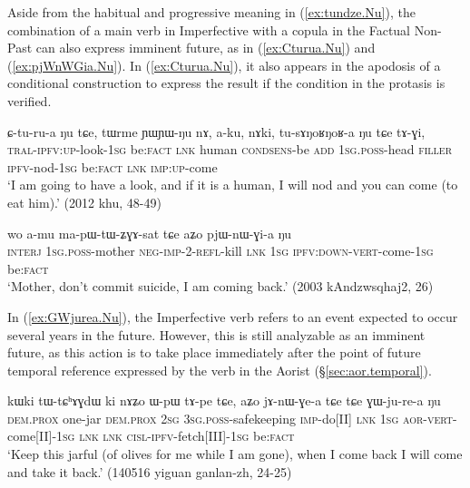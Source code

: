 Aside from the habitual and progressive meaning in (\ref{ex:tundze.Nu}), the  combination of a main verb in Imperfective with a copula in the Factual Non-Past can also express imminent future, as in (\ref{ex:Cturua.Nu}) and (\ref{ex:pjWnWGia.Nu}). In (\ref{ex:Cturua.Nu}), it also appears in the apodosis of a conditional construction to express the result if the condition in the protasis is verified.

\begin{exe}
\ex \label{ex:Cturua.Nu}
\gll  ɕ-tu-ru-a ŋu tɕe, tɯrme ɲɯ\redp{}ɲɯ-ŋu nɤ, a-ku, nɤki, tu-sɤŋoʁŋoʁ-a ŋu tɕe tɤ-ɣi, \\
\textsc{tral}-\textsc{ipfv}:\textsc{up}-look-\textsc{1sg} be:\textsc{fact} \textsc{lnk} human \textsc{cond}\redp{}\textsc{sens}-be \textsc{add} \textsc{1sg}.\textsc{poss}-head \textsc{filler} \textsc{ipfv}-nod-\textsc{1sg} be:\textsc{fact} \textsc{lnk} \textsc{imp}:\textsc{up}-come \\
\glt `I am going to have a look, and if it is a human, I will nod and you can come (to eat him).' (2012 khu, 48-49)
\end{exe}

\begin{exe}
\ex \label{ex:pjWnWGia.Nu}
\gll wo a-mu ma-pɯ-tɯ-ʑɣɤ-sat tɕe aʑo pjɯ-nɯ-ɣi-a ŋu \\
\textsc{interj} \textsc{1sg}.\textsc{poss}-mother \textsc{neg}-\textsc{imp}-2-\textsc{refl}-kill \textsc{lnk} \textsc{1sg} \textsc{ipfv}:\textsc{down}-\textsc{vert}-come-\textsc{1sg} be:\textsc{fact} \\
\glt `Mother, don't commit suicide, I am coming back.' (2003 kAndzwsqhaj2, 26)
\end{exe}

In (\ref{ex:GWjurea.Nu}), the Imperfective verb  refers to an event expected to occur several years in the future. However, this is still analyzable as an imminent future, as this action is to take place immediately after the point of future temporal reference expressed by the verb  in the Aorist (§\ref{sec:aor.temporal}).

\begin{exe}
\ex \label{ex:GWjurea.Nu}
\gll  kɯki tɯ-tɕʰɤɣdɯ ki nɤʑo ɯ-pɯ tɤ-pe tɕe,  aʑo jɤ-nɯ-ɣe-a tɕe tɕe ɣɯ-ju-re-a ŋu\\
\textsc{dem}.\textsc{prox} one-jar \textsc{dem}.\textsc{prox} \textsc{2sg} \textsc{3sg}.\textsc{poss}-safekeeping \textsc{imp}-do[II] \textsc{lnk} \textsc{1sg} \textsc{aor}-\textsc{vert}-come[II]-\textsc{1sg} \textsc{lnk} \textsc{lnk} \textsc{cisl}-\textsc{ipfv}-fetch[III]-\textsc{1sg} be:\textsc{fact}\\
\glt `Keep this jarful (of olives for me while I am gone), when I come back I will come and take it back.' (140516 yiguan ganlan-zh, 24-25)
\end{exe}

